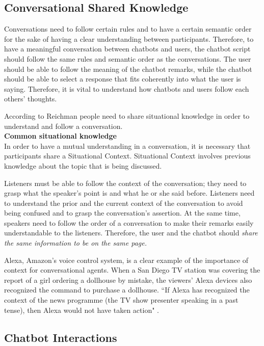 \documentclass[a4paper,10pt]{article}
\begin{document}
\subsection*{Conversational Shared Knowledge}

Conversations need to follow certain rules and to have a certain semantic order for the sake of having a clear understanding between participants. Therefore, to have a meaningful conversation between chatbots and users, the chatbot script should follow the same rules and semantic order as the conversations. The user should be able to follow the meaning of the chatbot remarks, while the chatbot should be able to select a response that fits coherently into what the user is saying. Therefore, it is vital to understand how chatbots and users follow each others' thoughts.

According to Reichman \cite{reichman1985getting} people need to share situational knowledge in order to understand and follow a conversation.\\[0\baselineskip]

\textbf{Common situational knowledge}\\[0\baselineskip]
In order to have a mutual understanding in a conversation, it is necessary that participants share a Situational Context. Situational Context involves previous knowledge about the topic that is being discussed.

Listeners must be able to follow the context of the conversation; they need to grasp what the speaker's point is and what he or she said before. Listeners need to understand the prior and the current context of the conversation to avoid being confused and to grasp the conversation's assertion. At the same time, speakers need to follow the order of a conversation to make their remarks easily understandable to the listeners. Therefore, the user and the chatbot should \textit{share the same information to be on the same page.} 

Alexa, Amazon's voice control system, is a clear example of the importance of context for conversational agents. When  a San Diego TV station was covering the report of a girl ordering a dollhouse by mistake, the viewers' Alexa devices also recognized the command to purchase a dollhouse. ``If Alexa has recognized the context of the news programme (the TV show presenter speaking in a past tense), then Alexa would not have taken action" \cite{WhatwecanlearnfromAlexasmistakes}.

\subsection*{Chatbot Interactions}
\end{document}
